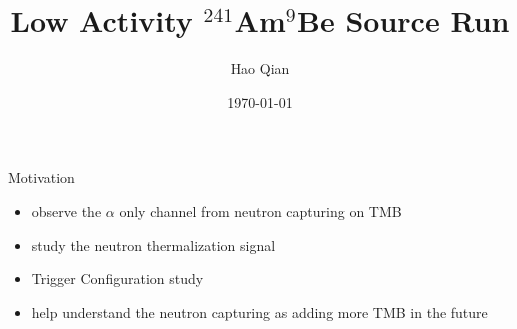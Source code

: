 \documentclass[9pt]{beamer}
\title{\huge Low Activity $^{241}$Am$^9$Be Source Run}
\author{Hao Qian}
\institute{\it Princeton University}
\date{\today}
\begin{document}
\begin{frame}
\titlepage
\end{frame}

\begin{frame}{Motivation}
\begin{itemize}
[bullet]
\item observe the $\alpha$ only channel from neutron capturing on TMB
\item study the neutron thermalization signal
\item Trigger Configuration study
\item help understand the neutron capturing as adding more TMB in the future
\end{itemize}
\end{frame}


\end{document}

